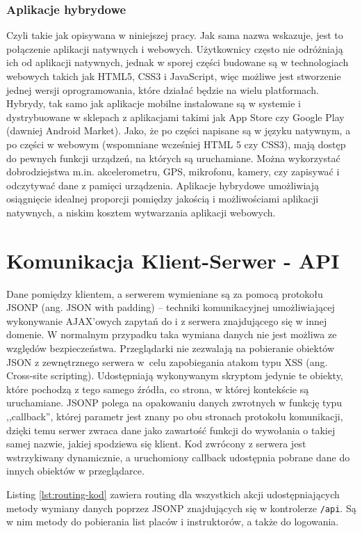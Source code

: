 \documentclass[twoside,a4paper,openright,12pt]{book}
\begin{document}
\subsubsection*{Aplikacje hybrydowe}
Czyli takie jak opisywana w niniejszej pracy. Jak sama nazwa wskazuje, jest to połączenie aplikacji natywnych i webowych. Użytkownicy często nie odróżniają ich od aplikacji natywnych, jednak w sporej części budowane są w technologiach webowych takich jak HTML5, CSS3 i JavaScript, więc możliwe jest stworzenie jednej wersji oprogramowania, które działać będzie na wielu platformach. Hybrydy, tak samo jak aplikacje mobilne instalowane są w systemie i dystrybuowane w sklepach z aplikacjami takimi jak App Store czy Google Play (dawniej Android Market).
Jako, że po części napisane są w języku natywnym, a po części w webowym (wspomniane wcześniej HTML 5 czy CSS3), mają dostęp do pewnych funkcji urządzeń, na których są uruchamiane. Można wykorzystać dobrodziejstwa m.in. akcelerometru, GPS, mikrofonu, kamery, czy zapisywać i odczytywać dane z pamięci urządzenia.
Aplikacje hybrydowe umożliwiają osiągnięcie idealnej proporcji pomiędzy jakością i możliwościami aplikacji natywnych, a niskim kosztem wytwarzania aplikacji webowych.


\section{Komunikacja Klient-Serwer - API}

Dane pomiędzy klientem, a serwerem wymieniane są za pomocą protokołu JSONP (ang. JSON with padding) -- techniki komunikacyjnej umożliwiającej wykonywanie AJAX'owych zapytań do i z serwera znajdującego się w innej domenie. W normalnym przypadku taka wymiana danych nie jest możliwa ze względów bezpieczeństwa. Przeglądarki nie zezwalają na pobieranie obiektów JSON z zewnętrznego serwera w~celu zapobiegania atakom typu XSS (ang. Cross-site scripting). Udostępniają wykonywanym skryptom jedynie te obiekty, które pochodzą z tego samego źródła, co strona, w której kontekście są uruchamiane. JSONP polega na opakowaniu danych zwrotnych w funkcję typu ,,callback'', której parametr jest znany po obu stronach protokołu komunikacji, dzięki temu serwer zwraca dane jako zawartość funkcji do wywołania o takiej samej nazwie, jakiej spodziewa się klient. Kod zwrócony z serwera jest wstrzykiwany dynamicznie, a uruchomiony callback udostępnia pobrane dane do innych obiektów w przeglądarce.

Listing \ref{lst:routing-kod} zawiera routing dla wszystkich akcji udostępniających metody wymiany danych poprzez JSONP znajdujących się w kontrolerze \texttt{/api}.
Są w nim metody do pobierania list placów i instruktorów, a także do logowania.
\end{document}
